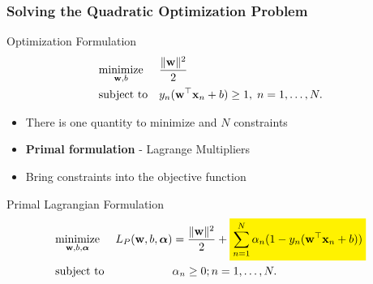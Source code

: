 \documentclass[10pt]{beamer}
\newcommand{\hilightbox}[1]{%
  \colorbox{yellow}{$\displaystyle#1$}}
\begin{document}
\begin{frame}
      {
        \frametitle{Solving the Quadratic Optimization Problem}
      }
    \begin{block}{Optimization Formulation}
      \begin{equation*}
        \begin{aligned}
          & \underset{{\bf w},b}{\text{minimize}}
          & & \frac{\Vert {\bf w} \Vert^2}{2} \\
          & \text{subject to}
          & & y_n({\bf w}^\top{\bf x}_n + b) \geq 1, \; n = 1, \ldots, N.
        \end{aligned}
      \end{equation*}
    \end{block}
    \begin{itemize}
      \item There is one quantity to minimize and $N$ constraints
      \item {\bf Primal formulation} - Lagrange Multipliers
      \item Bring constraints into the objective function
    \end{itemize}
    \pause
    \begin{block}{Primal Lagrangian Formulation}
      \begin{equation*}
        \begin{aligned}
          & \underset{{\bf w},b,{\bm \alpha}}{\text{minimize}}
          & L_P({\bf w},b,{\bm \alpha}) & = \frac{\Vert {\bf w} \Vert^2}{2} + \hilightbox{\sum_{n=1}^N\alpha_n(1 - y_n({\bf w}^\top{\bf x}_n + b))}\\
          & \text{subject to}
          & & \alpha_n \geq 0; n = 1, \ldots, N.
        \end{aligned}
      \end{equation*}
    \end{block}
\end{frame}
\end{document}
